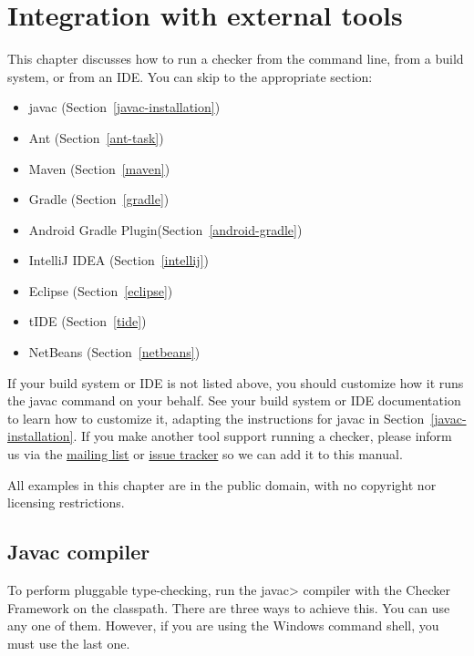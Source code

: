 \htmlhr
\chapter{Integration with external tools\label{external-tools}}

This chapter discusses how to run a checker from the command line, from a
build system, or from an IDE\@.  You can skip to the appropriate section:

\begin{itemize}
\item javac (Section~\ref{javac-installation})
\item Ant (Section~\ref{ant-task})
\item Maven (Section~\ref{maven})
\item Gradle (Section~\ref{gradle})
\item Android Gradle Plugin(Section~\ref{android-gradle})
\item IntelliJ IDEA (Section~\ref{intellij})
\item Eclipse (Section~\ref{eclipse})
\item tIDE (Section~\ref{tide})
\item NetBeans (Section~\ref{netbeans})
\end{itemize}

If your build system or IDE is not listed above, you should customize how
it runs the javac command on your behalf.  See your build system or IDE
documentation to learn how to
customize it, adapting the instructions for javac in Section~\ref{javac-installation}.
If you make another tool support running a checker, please
inform us via the
\href{https://groups.google.com/forum/#!forum/checker-framework-discuss}{mailing
  list} or
\href{https://github.com/typetools/checker-framework/issues}{issue tracker} so
we can add it to this manual.

All examples in this chapter are in the public domain, with no copyright nor
licensing restrictions.


\section{Javac compiler\label{javac-installation}}

To perform pluggable type-checking, run the \<javac> compiler with the
Checker Framework on the classpath.
There are three ways to achieve this.  You can use any
one of them.  However, if you are using the Windows command shell, you must
use the last one.


